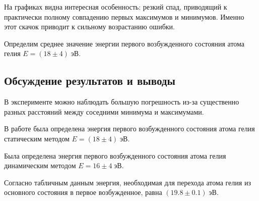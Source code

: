 \documentclass[10pt,a4paper]{article}
\begin{document}
	На графиках видна интересная особенность: резкий спад, приводящий к практически полному совпадению первых максимумов и минимумов. Именно этот скачок приводит к сильному возрастанию ошибки.
	
	Определим среднее значение энергии первого возбужденного состояния атома гелия $E = (18 \pm 4) \; эВ$.
	
	\subsection*{Обсуждение результатов и выводы}
		
	В эксперименте можно наблюдать большую погрешность из-за существенно разных расстояний между соседними минимума и максимумами.
	
	В работе была определена энергия первого возбужденного состояния атома гелия статическим методом $E = (18 \pm 4) \; эВ$.
	
	Была определена энергия первого возбужденного состояния атома гелия динамическим методом  $E = 16 \pm 4 \; эВ$.
	
	Согласно табличным данным энергия, необходимая для перехода атома гелия из основного состояния в первое возбужденное, равна $(19.8 \pm 0.1) \; эВ$.

	
\end{document}
